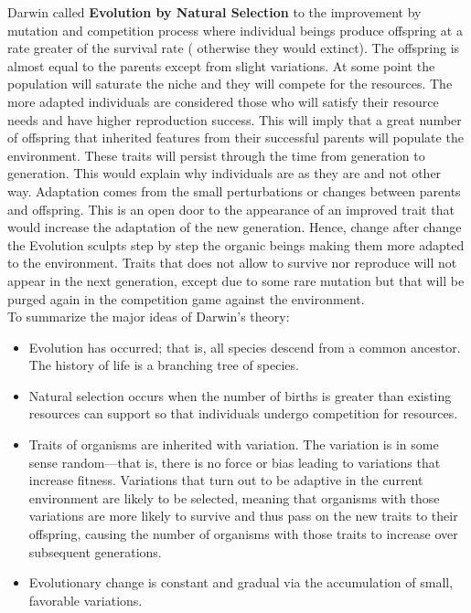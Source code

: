 \documentclass[11pt,oneside,a4paper,openright]{report}
\begin{document}
Darwin called \textbf{Evolution by Natural Selection} to the improvement by mutation and competition process 
where individual beings produce offspring at a rate greater of the survival rate ( otherwise they 
would extinct). The offspring is almost equal to the parents except from slight variations. At 
some point the population will saturate the niche and they will compete for the resources.
The more adapted individuals are considered those who will satisfy their resource needs and
have higher reproduction success. This will imply that a great number of offspring that inherited
features from their successful parents will populate the environment. These traits will persist
through the time from generation to generation. This would explain why individuals are as they are
and not other way. Adaptation comes from the small perturbations or changes between parents and
offspring. This is an open door to the appearance of an improved trait that would increase the adaptation
of the new generation. Hence, change after change the Evolution sculpts step by step the organic beings
making them more adapted to the environment. Traits that does not allow to survive nor reproduce will 
not appear in the next generation, except due to some rare mutation but that will be purged again in the 
competition game against the environment.\\

To summarize the major ideas of Darwin’s theory:
\begin{itemize}
	\item Evolution has occurred; that is, all species descend from a common
	ancestor. The history of life is a branching tree of species.
	\item Natural selection occurs when the number of births is greater than
	existing resources can support so that individuals undergo
	competition for resources.
	\item Traits of organisms are inherited with variation. The variation is in
	some sense random—that is, there is no force or bias leading to
	variations that increase fitness. Variations that turn out to be adaptive in 
	the current environment are likely to be selected, meaning that organisms with 
	those variations are more likely to survive and thus pass on the new traits to their
	offspring, causing the number of organisms with those traits to increase over 
	subsequent generations.
	\item Evolutionary change is constant and gradual via the accumulation of
	small, favorable variations.
\end{itemize}
\end{document}
